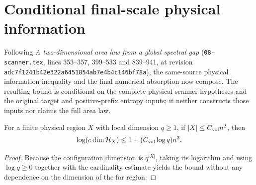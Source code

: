 \section{Conditional final-scale physical information}
\label{sec:source-final-information}

Following \emph{A two-dimensional area law from a global spectral gap}
(\texttt{08-scanner.tex}, lines 353--357, 399--533 and 839--941, at revision
\texttt{adc7f1241b42e322a6451854ab7e4b4c146bf78a}), the same-source physical
information inequality and the final numerical absorption now compose. The
resulting bound is conditional on the complete physical scanner hypotheses and
the original target and positive-prefix entropy inputs; it neither constructs
those inputs nor claims the full area law.

\begin{lemma}
    \label{thm:physical-information-dimension}
    \leanok
    For a finite physical region $X$ with local dimension $q\geq1$, if
    $|X|\leq C_{\rm vol}n^2$, then
    \[
        \log(e\dim\mathcal H_X)
        \leq 1+(C_{\rm vol}\log q)n^2.
    \]
\end{lemma}

\begin{proof}
    \leanok
    Because the configuration dimension is $q^{|X|}$, taking its logarithm and
    using $\log q\geq0$ together with the cardinality estimate yields the bound
    without any dependence on the dimension of the far region.
\end{proof}

